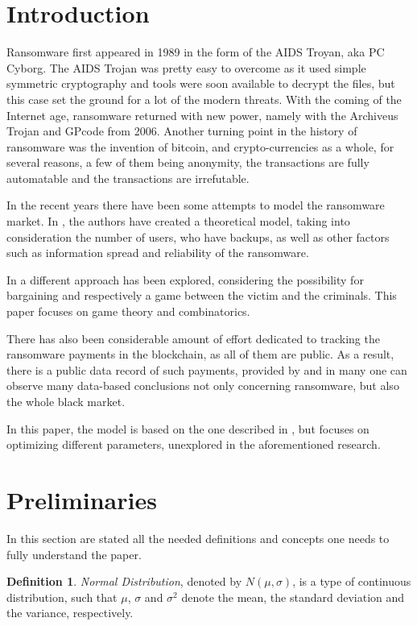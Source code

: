 \documentclass[11pt, a4paper]{article}
\theoremstyle{definition}
\newtheorem{definition}{Definition}
\begin{document}
\section{Introduction}
		Ransomware first appeared in 1989 in the form of the AIDS Troyan, aka PC Cyborg.  The AIDS Trojan was pretty easy to overcome as it used simple symmetric cryptography and tools were soon available to decrypt the files, but this case set the ground for a lot of the modern threats. With the coming of the Internet age, ransomware returned with new power, namely with the Archiveus Trojan and GPcode from 2006. Another turning point in the history of ransomware was the invention of bitcoin, and crypto-currencies as a whole, for several reasons, a few of them being anonymity, the transactions are fully automatable and the transactions are irrefutable\cite{huang2018tracking}.\par
		In the recent years there have been some attempts to model the ransomware market. In \cite{caulfielddynamic}, the authors have created a theoretical model, taking into consideration the number of users, who have backups, as well as other factors such as information spread and reliability of the ransomware.\par                 
		In \cite{cartwright2018pay} a different approach has been explored, considering the possibility for bargaining and respectively a game between the victim and the criminals. This paper focuses on game theory and combinatorics.\par
		There has also been considerable amount of effort dedicated to tracking the ransomware payments in the blockchain, as all of them are public. As a result, there is a public data record of such payments, provided by \cite{paquet2019ransomware} and in \cite{thomas2015framing} many one can observe many data-based conclusions not only concerning ransomware, but also the whole black market.\par
		In this paper, the model is based on the one described in \cite{caulfielddynamic}, but focuses on optimizing different parameters, unexplored in the aforementioned research. 
\newpage
	\section{Preliminaries}
	In this section are stated all the needed definitions and concepts one needs to fully understand the paper.
		\begin{definition}
			\label{def:normdist}
			\emph{Normal Distribution}, denoted by $N(\mu, \sigma)$, is a type of continuous distribution, such that $\mu$, $\sigma$ and $\sigma^{2}$ denote the mean, the standard deviation and the variance, respectively.
		\end{definition}
	
\end{document}
